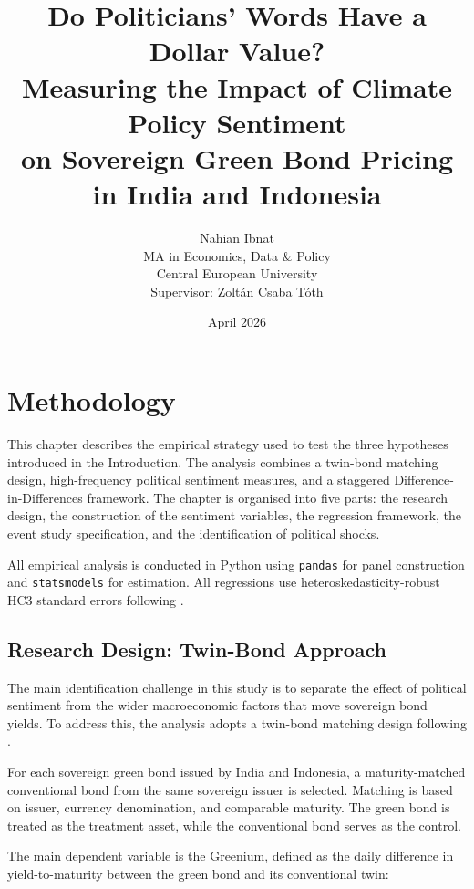 \documentclass[12pt,a4paper]{article}
\title{%
  \textbf{Do Politicians' Words Have a Dollar Value?} \\[0.5em]
  \Large Measuring the Impact of Climate Policy Sentiment \\
  on Sovereign Green Bond Pricing in India and Indonesia%
}
\author{%
  Nahian Ibnat \\[0.3em]
  \normalsize MA in Economics, Data \& Policy \\
  \normalsize Central European University \\[0.5em]
  \normalsize Supervisor: Zolt\'{a}n Csaba T\'{o}th%
}
\date{April 2026}
\begin{document}
\maketitle
\thispagestyle{empty}
\newpage





\newpage
\setcounter{section}{3}   
\section{Methodology}

This chapter describes the empirical strategy used to test the three hypotheses introduced in the Introduction. The analysis combines a twin-bond matching design, high-frequency political sentiment measures, and a staggered Difference-in-Differences framework. The chapter is organised into five parts: the research design, the construction of the sentiment variables, the regression framework, the event study specification, and the identification of political shocks.

All empirical analysis is conducted in Python using \texttt{pandas} for panel construction and \texttt{statsmodels} for estimation. All regressions use heteroskedasticity-robust HC3 standard errors following \citet{MacKinnon1985}.

\subsection{Research Design: Twin-Bond Approach}

The main identification challenge in this study is to separate the effect of political sentiment from the wider macroeconomic factors that move sovereign bond yields. To address this, the analysis adopts a twin-bond matching design following \citet{Zerbib2019}.

For each sovereign green bond issued by India and Indonesia, a maturity-matched conventional bond from the same sovereign issuer is selected. Matching is based on issuer, currency denomination, and comparable maturity. The green bond is treated as the treatment asset, while the conventional bond serves as the control.

The main dependent variable is the Greenium, defined as the daily difference in yield-to-maturity between the green bond and its conventional twin:
\end{document}
